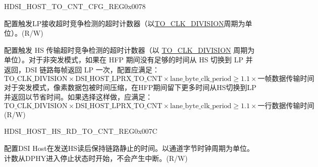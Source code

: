     
    \begin{register}{H}{DSI\_HOST\_TO\_CNT\_CFG\_REG}{0x0078}\label{regdesc:DSIHOSTTOCNTCFGREG}
    \regnewline%
    \begin{regdesc}\begin{reglist}
    \label{fielddesc:DSIHOSTLPRXTOCNT}\item [DSI\_HOST\_LPRX\_TO\_CNT] 配置触发LP接收超时竞争检测的超时计数器（以\hyperref[fielddesc:DSIHOSTTOCLKDIVISION]{TO\_CLK\_DIVISION}周期为单位）。(R/W)
    \label{fielddesc:DSIHOSTHSTXTOCNT}\item [DSI\_HOST\_HSTX\_TO\_CNT] 配置触发 HS 传输超时竞争检测的超时计数器（以 \hyperref[fielddesc:DSIHOSTTOCLKDIVISION]{TO\_CLK\_DIVISION} 周期为单位）。对于非突发模式，如果在 HFP 期间没有足够的时间从 HS 切换到 LP 并返回，DSI 链路每帧返回 LP 一次，配置应满足：
    \[
    \hyperref[fielddesc:DSIHOSTTOCLKDIVISION]{\text{TO\_CLK\_DIVISION}} × \hyperref[fielddesc:DSIHOSTLPRXTOCNT]{\text{DSI\_HOST\_LPRX\_TO\_CNT}} × \text{lane\_byte\_clk\_period} \ge 1.1 × \text{一帧数据传输时间}
\]
    对于突发模式，像素数据包被时间压缩，在HFP期间留下更多时间从HS切换到LP并返回以节省时间。如果选择这样做，应满足：
    \[
    \hyperref[fielddesc:DSIHOSTTOCLKDIVISION]{\text{TO\_CLK\_DIVISION}} × \hyperref[fielddesc:DSIHOSTLPRXTOCNT]{\text{DSI\_HOST\_LPRX\_TO\_CNT}} × \text{lane\_byte\_clk\_period} \ge 1.1 × \text{一行数据传输时间}
    \]
    (R/W)
    \end{reglist}\end{regdesc}
    \end{register}
    
    
    \begin{register}{H}{DSI\_HOST\_HS\_RD\_TO\_CNT\_REG}{0x007C}\label{regdesc:DSIHOSTHSRDTOCNTREG}
    \regnewline%
    \begin{regdesc}\begin{reglist}
    \label{fielddesc:DSIHOSTHSRDTOCNT}\item [DSI\_HOST\_HS\_RD\_TO\_CNT] 配置DSI Host在发送HS读后保持链路静止的时间。以通道字节时钟周期为单位。计数从DPHY进入停止状态时开始，不会产生中断。(R/W)
    \end{reglist}\end{regdesc}
    \end{register}
    
